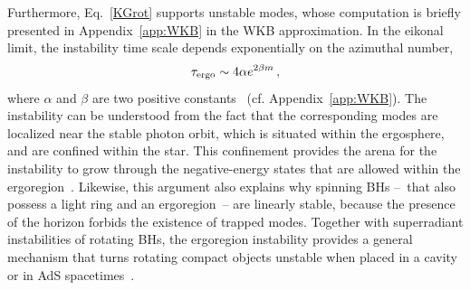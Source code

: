 \documentclass[11pt]{article}
\numberwithin{equation}{section} %
\begin{document}
Furthermore, Eq.~\eqref{KGrot} supports unstable modes, whose computation is briefly presented in Appendix~\ref{app:WKB} in the WKB approximation. In the eikonal limit, the instability time scale depends exponentially on the azimuthal number, 
%
\begin{equation}
\tau_{\rm ergo} \sim 4\alpha e^{2\beta m}\,, \label{tau_ergo_eikonal}
\end{equation}
%
where $\alpha$ and $\beta$ are two positive constants~\cite{CominsSchutz} (cf. Appendix~\ref{app:WKB}). The instability can be understood from the fact that the corresponding modes are localized near the stable photon orbit, which is situated within the ergosphere, and are confined within the star. This confinement provides the arena for the instability to grow through the negative-energy states that are allowed within the ergoregion~\cite{1978CMaPh..63..243F}. Likewise, this argument also explains why spinning BHs --~that also possess a light ring and an ergoregion~-- are linearly stable, because the presence of the horizon forbids the existence of trapped modes.
Together with superradiant instabilities of rotating BHs, the ergoregion instability provides a general mechanism that turns rotating compact objects unstable when placed in a cavity or in AdS spacetimes~\cite{Ishii:2020muv}.



\end{document}
